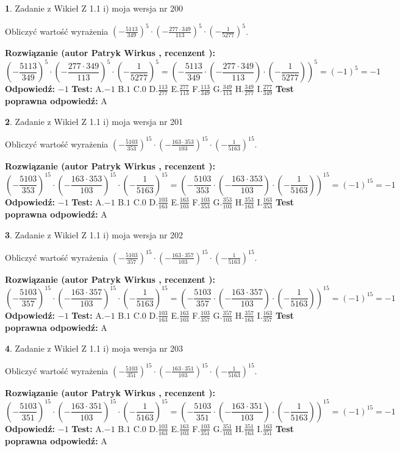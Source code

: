 \documentclass[12pt, a4paper]{article}
\theoremstyle{definition} %
\newtheorem{zad}{}
\newcommand{\zadStart}[1]{\begin{zad}#1\newline}
\newcommand{\zadStop}{\end{zad}}
\newcommand{\rozwStart}[2]{\noindent \textbf{Rozwiązanie (autor #1 , recenzent #2): }\newline}
\newcommand{\rozwStop}{\newline}
\newcommand{\odpStart}{\noindent \textbf{Odpowiedź:}\newline}
\newcommand{\odpStop}{\newline}
\newcommand{\testStart}{\noindent \textbf{Test:}\newline}
\newcommand{\testStop}{\newline}
\newcommand{\kluczStart}{\noindent \textbf{Test poprawna odpowiedź:}\newline}
\newcommand{\kluczStop}{\newline}
\begin{document}
\zadStart{Zadanie z Wikieł Z 1.1 i) moja wersja nr 200}

Obliczyć wartość wyrażenia $(-\frac{5113}{349})^{5} \cdot (-\frac{277 \cdot 349}{113})^{5} \cdot (-\frac{1}{5277})^{5}$.
\zadStop
\rozwStart{Patryk Wirkus}{}
$$(-\frac{5113}{349})^{5} \cdot (-\frac{277 \cdot 349}{113})^{5} \cdot (-\frac{1}{5277})^{5} = (-\frac{5113}{349} \cdot (-\frac{277 \cdot 349}{113}) \cdot (-\frac{1}{5277}))^{5} = (-1)^{5} = -1$$
\rozwStop
\odpStart
$-1$
\odpStop
\testStart
A.$-1$ B.$1$ C.$0$ D.$\frac{113}{277}$ E.$\frac{277}{113}$
F.$\frac{113}{349}$ G.$\frac{349}{113}$
H.$\frac{349}{277}$
I.$\frac{277}{349}$
\testStop
\kluczStart
A
\kluczStop



\zadStart{Zadanie z Wikieł Z 1.1 i) moja wersja nr 201}

Obliczyć wartość wyrażenia $(-\frac{5103}{353})^{15} \cdot (-\frac{163 \cdot 353}{103})^{15} \cdot (-\frac{1}{5163})^{15}$.
\zadStop
\rozwStart{Patryk Wirkus}{}
$$(-\frac{5103}{353})^{15} \cdot (-\frac{163 \cdot 353}{103})^{15} \cdot (-\frac{1}{5163})^{15} = (-\frac{5103}{353} \cdot (-\frac{163 \cdot 353}{103}) \cdot (-\frac{1}{5163}))^{15} = (-1)^{15} = -1$$
\rozwStop
\odpStart
$-1$
\odpStop
\testStart
A.$-1$ B.$1$ C.$0$ D.$\frac{103}{163}$ E.$\frac{163}{103}$
F.$\frac{103}{353}$ G.$\frac{353}{103}$
H.$\frac{353}{163}$
I.$\frac{163}{353}$
\testStop
\kluczStart
A
\kluczStop



\zadStart{Zadanie z Wikieł Z 1.1 i) moja wersja nr 202}

Obliczyć wartość wyrażenia $(-\frac{5103}{357})^{15} \cdot (-\frac{163 \cdot 357}{103})^{15} \cdot (-\frac{1}{5163})^{15}$.
\zadStop
\rozwStart{Patryk Wirkus}{}
$$(-\frac{5103}{357})^{15} \cdot (-\frac{163 \cdot 357}{103})^{15} \cdot (-\frac{1}{5163})^{15} = (-\frac{5103}{357} \cdot (-\frac{163 \cdot 357}{103}) \cdot (-\frac{1}{5163}))^{15} = (-1)^{15} = -1$$
\rozwStop
\odpStart
$-1$
\odpStop
\testStart
A.$-1$ B.$1$ C.$0$ D.$\frac{103}{163}$ E.$\frac{163}{103}$
F.$\frac{103}{357}$ G.$\frac{357}{103}$
H.$\frac{357}{163}$
I.$\frac{163}{357}$
\testStop
\kluczStart
A
\kluczStop



\zadStart{Zadanie z Wikieł Z 1.1 i) moja wersja nr 203}

Obliczyć wartość wyrażenia $(-\frac{5103}{351})^{15} \cdot (-\frac{163 \cdot 351}{103})^{15} \cdot (-\frac{1}{5163})^{15}$.
\zadStop
\rozwStart{Patryk Wirkus}{}
$$(-\frac{5103}{351})^{15} \cdot (-\frac{163 \cdot 351}{103})^{15} \cdot (-\frac{1}{5163})^{15} = (-\frac{5103}{351} \cdot (-\frac{163 \cdot 351}{103}) \cdot (-\frac{1}{5163}))^{15} = (-1)^{15} = -1$$
\rozwStop
\odpStart
$-1$
\odpStop
\testStart
A.$-1$ B.$1$ C.$0$ D.$\frac{103}{163}$ E.$\frac{163}{103}$
F.$\frac{103}{351}$ G.$\frac{351}{103}$
H.$\frac{351}{163}$
I.$\frac{163}{351}$
\testStop
\kluczStart
A
\kluczStop
\end{document}
